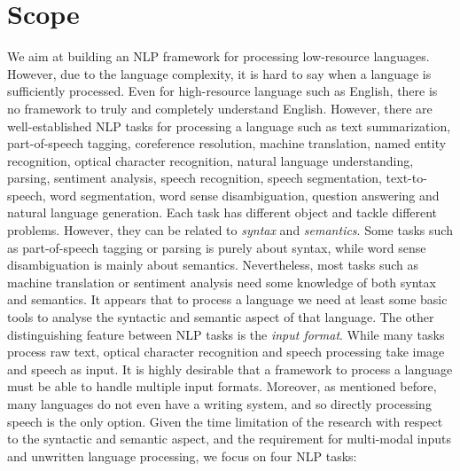 \documentclass[12pt,twoside,final,hidelinks]{ltthesis}
\theoremstyle{definition}
\begin{document}
\section{Scope}
We aim at building an NLP framework for processing low-resource languages. However, due to the language complexity, it is hard to say when a language is sufficiently processed. Even for high-resource language such as English, there is no framework to truly and completely understand English. However, there are well-established NLP tasks for processing a language such as text summarization, part-of-speech tagging, coreference resolution, machine translation, named entity recognition, optical character recognition, natural language understanding, parsing, sentiment analysis, speech recognition, speech segmentation, text-to-speech, word segmentation, word sense disambiguation, question answering and natural language generation. 
Each task has different object and tackle different problems. However, they can be related to \textit{syntax} and \textit{semantics}. Some tasks such as part-of-speech tagging or parsing is purely about syntax, while word sense disambiguation is mainly about semantics. Nevertheless, most tasks such as machine translation or sentiment analysis need some knowledge of both syntax and semantics. It appears that to process a language we need at least some basic tools to analyse the syntactic and semantic aspect of that language. 
The other distinguishing feature between NLP tasks is the \textit{input format}. While many tasks process raw text, optical character recognition and speech processing take image and speech as input. It is highly desirable that a framework to process a language must be able to handle multiple input formats. Moreover, as mentioned before, many languages do not even have a writing system, and so directly processing speech is the only option. 
Given the time limitation of the research with respect to the syntactic and semantic aspect, and the requirement for multi-modal inputs and unwritten language processing, we focus on four NLP tasks:
\end{document}
